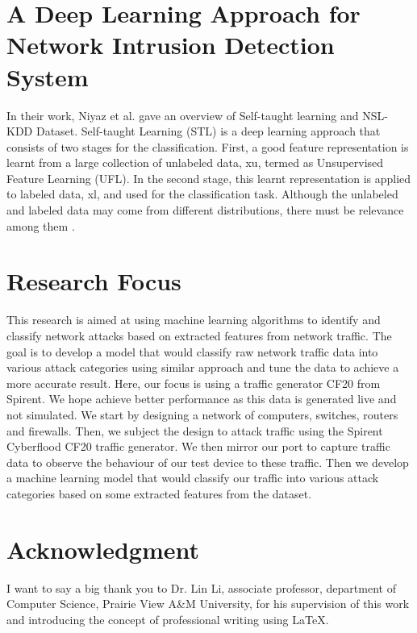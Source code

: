 \documentclass[conference]{IEEEtran}
\begin{document}
\section{A Deep Learning Approach for Network Intrusion Detection System}
    In their work, Niyaz et al. gave an overview of Self-taught learning and NSL-KDD Dataset. Self-taught Learning (STL) is a deep learning approach that consists of two stages for the classification. First, a good feature representation is learnt from a large collection of unlabeled data, xu, termed as Unsupervised Feature Learning (UFL). In the second stage, this learnt representation is applied to labeled data, xl, and used for the classification task. Although the unlabeled and labeled data may come from different distributions, there must be relevance among them \cite{Niyaz2016}.

\section{Research Focus}
    This research is aimed at using machine learning algorithms to identify and classify network attacks based on extracted features from network traffic. The goal is to develop a model that would classify raw network traffic data into various attack categories using similar approach and tune the data to achieve a more accurate result. Here, our focus is using a traffic generator CF20 from Spirent. We hope achieve better performance as this data is generated live and not simulated.
    We start by designing a network of computers, switches, routers and firewalls. Then, we subject the design to attack traffic using the Spirent Cyberflood CF20 traffic generator. We then mirror our port to capture traffic data to observe the behaviour of our test device to these traffic. Then we develop a machine learning model that would classify our traffic into various attack categories based on some extracted features from the dataset.
    
\section*{Acknowledgment}

    I want to say a big thank you to Dr. Lin Li, associate professor, department of Computer Science, Prairie View A\&M University, for his supervision of this work and introducing the concept of professional writing using \LaTeX.




\end{document}
